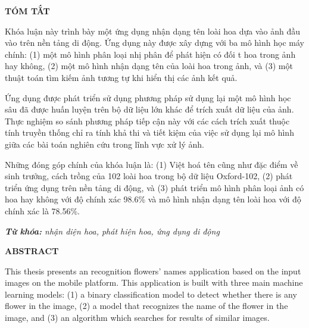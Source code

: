 \documentclass[12pt]{report}
\begin{document}
		\newpage
		\begin{center}
			\textbf{\large TÓM TẮT}
		\end{center}
																																																																						
		Khóa luận này trình bày một ứng dụng nhận dạng tên loài hoa dựa vào ảnh đầu vào trên nền tảng di động. Ứng dụng này được xây dựng với ba mô hình học máy chính: (1) một mô hình phân loại nhị phân để phát hiện có đối t hoa trong ảnh hay không, (2) một mô hình nhận dạng tên của loài hoa trong ảnh, và (3) một thuật toán tìm kiếm ảnh tương tự khi hiển thị các ảnh kết quả. 
																																																																						
		Ứng dụng được phát triển sử dụng phương pháp sử dụng lại một mô hình học sâu đã được huấn luyện trên bộ dữ liệu lớn khác để trích xuất dữ liệu của ảnh. Thực nghiệm so sánh phương pháp tiếp cận này với các cách trích xuất thuộc tính truyền thống chỉ ra tính khả thi và tiết kiệm của việc sử dụng lại mô hình giữa các bài toán nghiên cứu trong lĩnh vực xử lý ảnh.
																																																																						
		Những đóng góp chính của khóa luận là: (1) Việt hoá tên cũng như đặc điểm về sinh trưởng, cách trồng của 102 loài hoa trong bộ dữ liệu Oxford-102, (2) phát triển ứng dụng trên nền tảng di động, và (3) phát triển mô hình phân loại ảnh có hoa hay không với độ chính xác 98.6\% và mô hình nhận dạng tên loài hoa với độ chính xác là 78.56\%.																			
																																																																						
		\noindent \textit{\textbf{Từ khóa:} nhận diện hoa, phát hiện hoa, ứng dụng di động}
																																																																						
		\newpage
		\begin{center}
			\textbf{\large ABSTRACT}
		\end{center}
																																																																						
		This thesis presents an recognition flowers’ names application based on the input images on the mobile platform. This application is built with three main machine learning models: (1) a binary classification model to detect whether there is any flower in the image, (2) a model that recognizes the name of the flower in the image, and (3) an algorithm which searches for results of similar images. 
																																																																						
\end{document}
